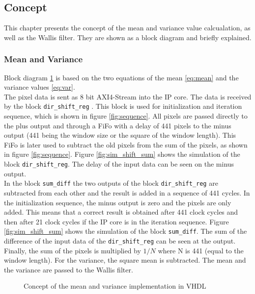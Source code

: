 \subsection{Concept} \label{ch:concept_vhdl}
This chapter presents the concept of the mean and variance value
calcualation, as well as the Wallis filter. They are shown as a block diagram and briefly explained.

\subsubsection*{Mean and Variance}
Block diagram \ref{fig:mean_var_vhdl} is based on the two equations of the mean 
\ref{eq:mean} and the variance values \ref{eq:var}. \\
The pixel data is sent as 8 bit AXI4-Stream into the IP core. The data is
received by the block \texttt{dir\_shift\_reg} . This block is used for
initialization and iteration sequence, which is shown in figure 
\ref{fig:sequence}. All pixels are passed directly to the plus output and
through a FiFo with a delay of 441 pixels to the minus output (441 being the
window size or the
square of the window length). This FiFo is later used to subtract the
old pixels from the sum of the pixels, as shown in figure \ref{fig:sequence}.
Figure \ref{fig:sim_shift_sum}
shows the simulation of the block \texttt{dir\_shift\_reg}. The delay of the
input data can be seen on the minus output. \\
In the block \texttt{sum\_diff} the two outputs of the block 
\texttt{dir\_shift\_reg} are subtracted from each other and the result is
added in a sequence of 441 cycles. In the initialization sequence, the minus
output is zero and the pixels are only added. This means that a correct result
is obtained after 441 clock cycles and then after 21 clock cycles if the
IP core is in the iteration sequence. Figure \ref{fig:sim_shift_sum} shows the
simulation of the block \texttt{sum\_diff}. The sum of the difference of the
input data of the \texttt{dir\_shift\_reg} can be seen at the output.\\
Finally, the sum of the pixels is multiplied by $1/N$ where N is 441 (equal to
the window length). For the variance, the square mean is subtracted. The mean
and the variance are passed to the Wallis filter.

\begin{figure}[tb!]
    \centering
    \begin{adjustbox}{max width=\textwidth, keepaspectratio}
        
    \end{adjustbox}
    \caption{Concept of the mean and variance implementation in VHDL}
    \label{fig:mean_var_vhdl}
\end{figure}

